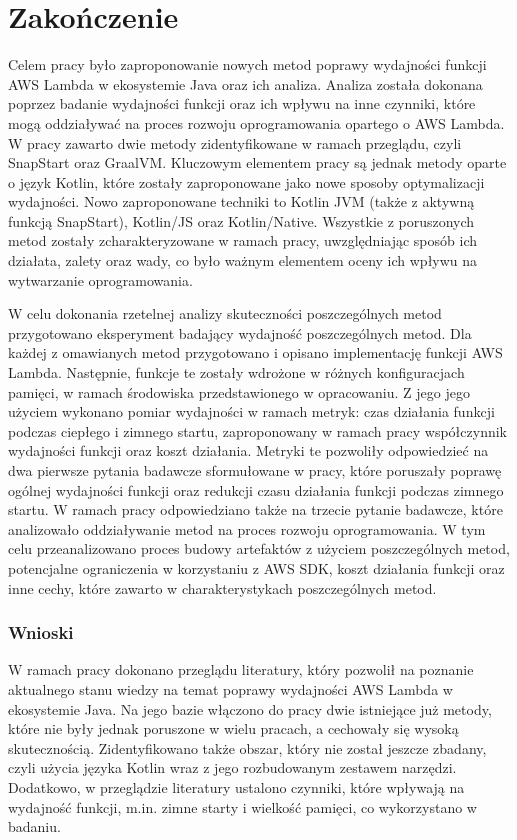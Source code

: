 \chapter*{Zakończenie}\label{chapter:zakonczenie}

Celem pracy było zaproponowanie nowych metod poprawy wydajności funkcji AWS Lambda w ekosystemie Java oraz ich analiza.
Analiza została dokonana poprzez badanie wydajności funkcji oraz ich wpływu na inne czynniki, które mogą oddziaływać na proces rozwoju oprogramowania opartego o AWS Lambda.
W pracy zawarto dwie metody zidentyfikowane w ramach przeglądu, czyli SnapStart oraz GraalVM.
Kluczowym elementem pracy są jednak metody oparte o język Kotlin, które zostały zaproponowane jako nowe sposoby optymalizacji wydajności.
Nowo zaproponowane techniki to Kotlin JVM (także z aktywną funkcją SnapStart), Kotlin/JS oraz Kotlin/Native.
Wszystkie z poruszonych metod zostały zcharakteryzowane w ramach pracy, uwzględniając sposób ich działata, zalety oraz wady, co było ważnym elementem oceny ich wpływu na wytwarzanie oprogramowania.

W celu dokonania rzetelnej analizy skuteczności poszczególnych metod przygotowano eksperyment badający wydajność poszczególnych metod.
Dla każdej z omawianych metod przygotowano i opisano implementację funkcji AWS Lambda.
Następnie, funkcje te zostały wdrożone w różnych konfiguracjach pamięci, w ramach środowiska przedstawionego w opracowaniu.
Z jego jego użyciem wykonano pomiar wydajności w ramach metryk: czas działania funkcji podczas ciepłego i zimnego startu, zaproponowany w ramach pracy współczynnik wydajności funkcji oraz koszt działania.
Metryki te pozwoliły odpowiedzieć na dwa pierwsze pytania badawcze sformułowane w pracy, które poruszały poprawę ogólnej wydajności funkcji oraz redukcji czasu działania funkcji podczas zimnego startu.
W ramach pracy odpowiedziano także na trzecie pytanie badawcze, które analizowało oddziaływanie metod na proces rozwoju oprogramowania.
W tym celu przeanalizowano proces budowy artefaktów z użyciem poszczególnych metod, potencjalne ograniczenia w korzystaniu z AWS SDK, koszt działania funkcji oraz inne cechy, które zawarto w charakterystykach poszczególnych metod.

\subsection*{Wnioski}

W ramach pracy dokonano przeglądu literatury, który pozwolił na poznanie aktualnego stanu wiedzy na temat poprawy wydajności AWS Lambda w ekosystemie Java.
Na jego bazie włączono do pracy dwie istniejące już metody, które nie były jednak poruszone w wielu pracach, a cechowały się wysoką skutecznością.
Zidentyfikowano także obszar, który nie został jeszcze zbadany, czyli użycia języka Kotlin wraz z jego rozbudowanym zestawem narzędzi.
Dodatkowo, w przeglądzie literatury ustalono czynniki, które wpływają na wydajność funkcji, m.in. zimne starty i wielkość pamięci, co wykorzystano w badaniu.

